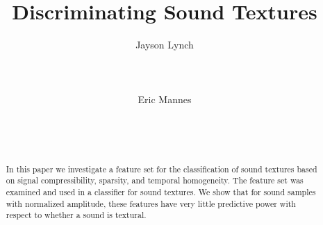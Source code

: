 \documentclass{sig-alternate-05-2015}
\begin{document}
\title{Discriminating Sound Textures}



\auskip

\author{
\alignauthor
  Jayson Lynch \\
  \\
       \\
       \\
\alignauthor Eric Mannes\\
\\
       \\
       \\
       }

\maketitle
\begin{abstract}
In this paper we investigate a feature set for the classification of sound textures based on signal compressibility, sparsity, and temporal homogeneity. The feature set was examined and used in a classifier for sound textures. We show that for sound samples with normalized amplitude, these features have very little predictive power with respect to whether a sound is textural. 
\end{abstract}

\end{document}
